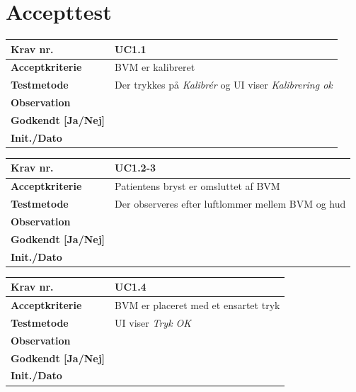 		\section{Accepttest}

		
\begin{table}[htb]
\begin{tabular}{|l|l|}
\hline
\textbf{Krav nr.}              & UC1.1  \\ \hline
\textbf{Acceptkriterie}        & BVM er kalibreret \\ \hline
\textbf{Testmetode}            & Der trykkes på \textit{Kalibrér} og UI viser \textit{Kalibrering ok} \\ \hline
\textbf{Observation}           &  \\ \hline
\textbf{Godkendt {[}Ja/Nej{]}} &  \\ \hline
\textbf{Init./Dato}            &  \\ \hline
\end{tabular}
\end{table}				

\begin{table}[htb]
\begin{tabular}{|l|l|}
\hline
\textbf{Krav nr.}              & UC1.2-3  \\ \hline
\textbf{Acceptkriterie}        & Patientens bryst er omsluttet af BVM \\ \hline
\textbf{Testmetode}            & Der observeres efter luftlommer mellem BVM og hud \\ \hline
\textbf{Observation}           &  \\ \hline
\textbf{Godkendt {[}Ja/Nej{]}} &  \\ \hline
\textbf{Init./Dato}            &  \\ \hline
\end{tabular}
\end{table}		
	
\begin{table}[htb]
\begin{tabular}{|l|l|}
\hline
\textbf{Krav nr.}              & UC1.4  \\ \hline
\textbf{Acceptkriterie}        & BVM er placeret med et ensartet tryk \\ \hline
\textbf{Testmetode}            & UI viser \textit{Tryk OK} \\ \hline
\textbf{Observation}           &  \\ \hline
\textbf{Godkendt {[}Ja/Nej{]}} &  \\ \hline
\textbf{Init./Dato}            &  \\ \hline
\end{tabular}
\end{table}		
			
